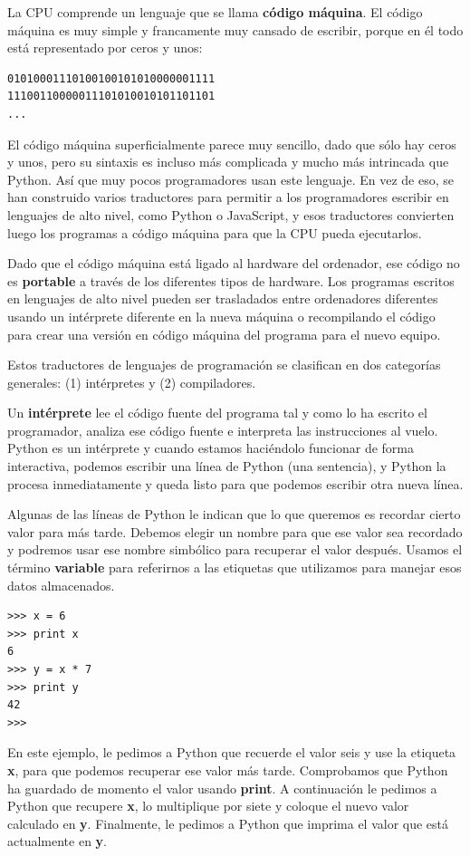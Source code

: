 La CPU comprende un lenguaje que se llama {\bf código máquina}. El código
máquina es muy simple y francamente muy cansado de escribir, porque
en él todo está representado por ceros y unos:

\beforeverb
\begin{verbatim}
01010001110100100101010000001111
11100110000011101010010101101101
...
\end{verbatim}
\afterverb
%
El código máquina superficialmente parece muy sencillo, dado que sólo hay
ceros y unos, pero su sintaxis es incluso más complicada
y mucho más intrincada que Python. Así que muy pocos programadores
usan este lenguaje. En vez de eso, se han construido varios traductores para
permitir a los programadores escribir en lenguajes de alto nivel, como Python
o JavaScript, y esos traductores convierten luego los programas a código máquina
para que la CPU pueda ejecutarlos.

Dado que el código máquina está ligado al hardware del ordenador, ese código
no es {\bf portable} a través de los diferentes tipos de hardware. Los programas escritos
en lenguajes de alto nivel pueden ser trasladados entre ordenadores diferentes usando
un intérprete diferente en la nueva máquina o recompilando el código para crear
una versión en código máquina del programa para el nuevo equipo.

Estos traductores de lenguajes de programación se clasifican en dos categorías generales:
(1) intérpretes y (2) compiladores.

Un {\bf intérprete} lee el código fuente del programa tal y como lo ha escrito
el programador, analiza ese código fuente e interpreta las instrucciones al vuelo.
Python es un intérprete y cuando estamos haciéndolo funcionar de forma interactiva,
podemos escribir una línea de Python (una sentencia), y Python la procesa inmediatamente
y queda listo para que podemos escribir otra nueva línea.

Algunas de las líneas de Python le indican que lo que queremos es recordar cierto
valor para más tarde. Debemos elegir un nombre para que ese valor sea recordado y
podremos usar ese nombre simbólico para recuperar el valor después. Usamos el
término {\bf variable} para referirnos a las etiquetas que utilizamos para manejar esos
datos almacenados.

\beforeverb
\begin{verbatim}
>>> x = 6
>>> print x
6
>>> y = x * 7
>>> print y
42
>>> 
\end{verbatim}
\afterverb
%
En este ejemplo, le pedimos a Python que recuerde el valor seis y use la etiqueta {\bf x},
para que podemos recuperar ese valor más tarde. Comprobamos que Python ha guardado de
momento el valor usando {\bf print}. A continuación le pedimos a Python que recupere {\bf x}, lo multiplique por siete y coloque el nuevo valor calculado en {\bf y}. Finalmente, le pedimos a Python que imprima el valor que está actualmente en {\bf y}.

